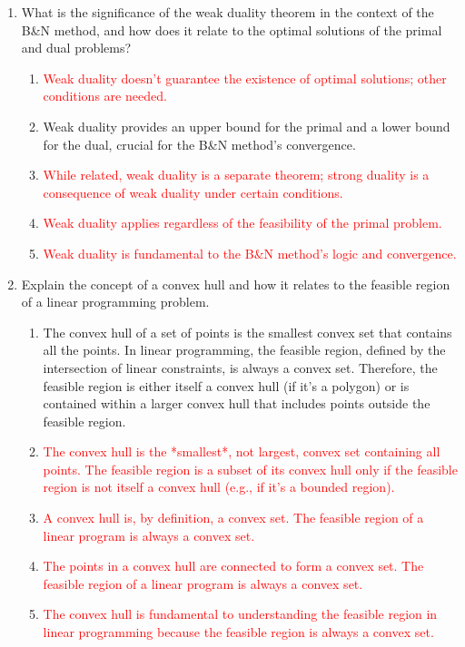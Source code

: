 \documentclass{article}%
\newcommand{\incorrect}[1]{\textcolor{red}{#1}}
\begin{document}
\begin{enumerate}
\begin{enumerate}
\end{enumerate}%
\vspace{1em}%
\item What is the significance of the weak duality theorem in the context of the B&N method, and how does it relate to the optimal solutions of the primal and dual problems?%
\begin{enumerate}%
\item \incorrect{Weak duality doesn't guarantee the existence of optimal solutions; other conditions are needed.}%
\item Weak duality provides an upper bound for the primal and a lower bound for the dual, crucial for the B&N method's convergence.%
\item \incorrect{While related, weak duality is a separate theorem; strong duality is a consequence of weak duality under certain conditions.}%
\item \incorrect{Weak duality applies regardless of the feasibility of the primal problem.}%
\item \incorrect{Weak duality is fundamental to the B&N method's logic and convergence.}%
\end{enumerate}%
\vspace{1em}%
\item Explain the concept of a convex hull and how it relates to the feasible region of a linear programming problem.%
\begin{enumerate}%
\item The convex hull of a set of points is the smallest convex set that contains all the points.  In linear programming, the feasible region, defined by the intersection of linear constraints, is always a convex set. Therefore, the feasible region is either itself a convex hull (if it's a polygon) or is contained within a larger convex hull that includes points outside the feasible region.%
\item \incorrect{The convex hull is the *smallest*, not largest, convex set containing all points. The feasible region is a subset of its convex hull only if the feasible region is not itself a convex hull (e.g., if it's a bounded region).}%
\item \incorrect{A convex hull is, by definition, a convex set. The feasible region of a linear program is always a convex set.}%
\item \incorrect{The points in a convex hull are connected to form a convex set. The feasible region of a linear program is always a convex set.}%
\item \incorrect{The convex hull is fundamental to understanding the feasible region in linear programming because the feasible region is always a convex set.}%

\end{enumerate}
\end{enumerate}
\end{document}
